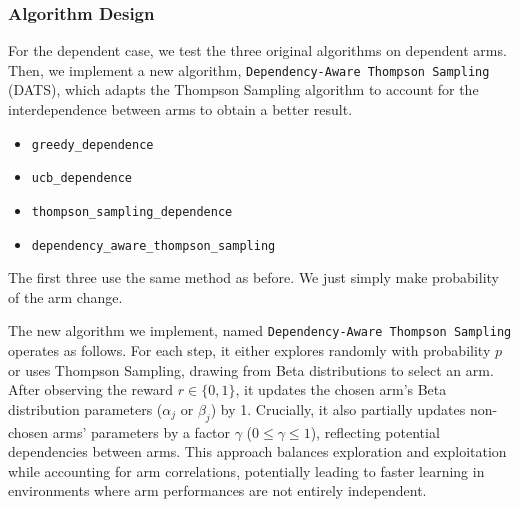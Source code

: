 \documentclass[11pt]{article}
\begin{document}
\subsubsection*{Algorithm Design}
For the dependent case, we test the three original algorithms on dependent arms. Then, we implement a new algorithm, \texttt{Dependency-Aware Thompson Sampling} (DATS), which adapts the Thompson Sampling algorithm to account for the interdependence between arms to obtain a better result.

\begin{itemize}
    \item \texttt{greedy\_dependence}
    \item \texttt{ucb\_dependence}
    \item \texttt{thompson\_sampling\_dependence}
    \item \texttt{dependency\_aware\_thompson\_sampling}
\end{itemize}

The first three use the same method as before. We just simply make probability of the arm change.

The new algorithm we implement, named \texttt{Dependency-Aware Thompson Sampling} operates as follows. For each step, it either explores randomly with probability $p$ or uses Thompson Sampling, drawing from Beta distributions to select an arm. After observing the reward $r \in \{0,1\}$, it updates the chosen arm's Beta distribution parameters ($\alpha_j$ or $\beta_j$) by 1. Crucially, it also partially updates non-chosen arms' parameters by a factor $\gamma$ ($0 \leq \gamma \leq 1$), reflecting potential dependencies between arms. This approach balances exploration and exploitation while accounting for arm correlations, potentially leading to faster learning in environments where arm performances are not entirely independent.
\end{document}
